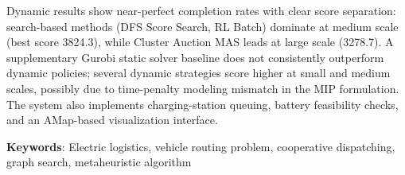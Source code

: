 \documentclass[12pt,a4paper,oneside]{book}
\begin{document}
Dynamic results show near-perfect completion rates with clear score separation: search-based methods (DFS Score Search, RL Batch) dominate at medium scale (best score 3824.3), while Cluster Auction MAS leads at large scale (3278.7). A supplementary Gurobi static solver baseline does not consistently outperform dynamic policies; several dynamic strategies score higher at small and medium scales, possibly due to time-penalty modeling mismatch in the MIP formulation. The system also implements charging-station queuing, battery feasibility checks, and an AMap-based visualization interface.

\noindent\textbf{Keywords}: Electric logistics, vehicle routing problem, cooperative dispatching, graph search, metaheuristic algorithm

\tableofcontents

\listoffigures
\listoftables







\end{document}
